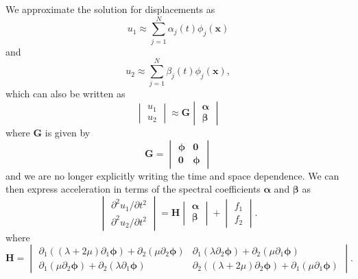 \documentclass[12pt]{article}
\begin{document}
We approximate the solution for displacements as 
\begin{equation}
  u_1 \approx \sum_{j=1}^{N}\alpha_{j}(t)\phi_j(\boldsymbol{x})
\end{equation}
and
\begin{equation}
  u_2 \approx \sum_{j=1}^{N}\beta_{j}(t)\phi_j(\boldsymbol{x}),
\end{equation}
which can also be written as 
\begin{equation}
\begin{vmatrix}
  u_1 \\
  u_2 
\end{vmatrix} \approx 
\boldsymbol{G}
\begin{vmatrix}
  \boldsymbol{\alpha}\\
  \boldsymbol{\beta}
\end{vmatrix}
\end{equation}
where $\boldsymbol{G}$ is given by
\begin{equation}
\boldsymbol{G} = 
\begin{vmatrix}
\boldsymbol{\phi}&\boldsymbol{0}\\
\boldsymbol{0}&\boldsymbol{\phi}
\end{vmatrix}
\end{equation}
and we are no longer explicitly writing the time and space dependence.
We can then express acceleration in terms of the spectral coefficients
$\boldsymbol{\alpha}$ and $\boldsymbol{\beta}$ as
\begin{equation}\label{Acceleration}
\begin{vmatrix}
  \partial^2 u_1/\partial t^2\\
  \partial^2 u_2/\partial t^2
\end{vmatrix} =
\boldsymbol{H}
\begin{vmatrix}
  \boldsymbol{\alpha}\\
  \boldsymbol{\beta}
\end{vmatrix} + 
\begin{vmatrix}
  f_1\\
  f_2
\end{vmatrix}.
\end{equation}
where
\begin{equation}
\boldsymbol{H} = 
\begin{vmatrix}
 \partial_1\left((\lambda + 2\mu)\partial_1 \boldsymbol{\phi}\right) +  
 \partial_2\left(\mu\partial_2 \boldsymbol{\phi}\right)&
 \partial_1\left(\lambda\partial_2 \boldsymbol{\phi}\right) +  
 \partial_2\left(\mu\partial_1 \boldsymbol{\phi}\right)\\
 \partial_1\left(\mu\partial_2 \boldsymbol{\phi}\right) +  
 \partial_2\left(\lambda\partial_1 \boldsymbol{\phi}\right)&
 \partial_2\left((\lambda + 2\mu)\partial_2 \boldsymbol{\phi}\right) +  
 \partial_1\left(\mu\partial_1 \boldsymbol{\phi}\right) 
\end{vmatrix}. 
\end{equation}
\end{document}

